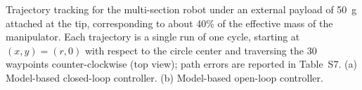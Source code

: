 \caption{Trajectory tracking for the multi-section robot under an external payload of 50~g attached at the tip, corresponding to about 40\% of the effective mass of the manipulator. Each trajectory is a single run of one cycle, starting at $(x, y) = (r, 0)$ with respect to the circle center and traversing the 30 waypoints counter-clockwise (top view); path errors are reported in Table~S7. (a) Model-based closed-loop controller. (b) Model-based open-loop controller.}
